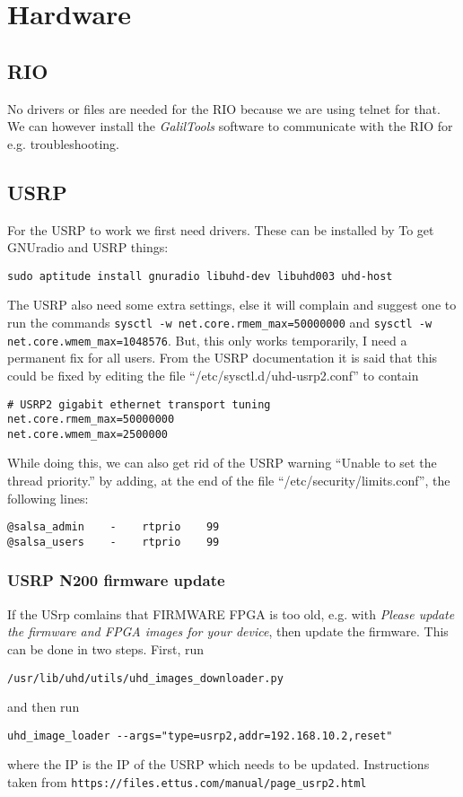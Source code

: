 \section{Hardware}
\subsection{RIO}
No drivers or files are needed for the RIO because we are using telnet for
that. We can however install the \emph{GalilTools} software to communicate
with the RIO for e.g. troubleshooting.

\subsection{USRP}
For the USRP to work we first need drivers. These can be installed by
To get GNUradio and USRP things: 
\begin{verbatim}
sudo aptitude install gnuradio libuhd-dev libuhd003 uhd-host
\end{verbatim}

The USRP also need some extra settings, else it will complain and suggest one
to run the commands 
\verb!sysctl -w net.core.rmem_max=50000000! and 
\verb!sysctl -w net.core.wmem_max=1048576!. But, this only works
temporarily, I need a permanent fix for all users. From the USRP documentation
it is said that this could be fixed by editing the file
“/etc/sysctl.d/uhd-usrp2.conf” to contain
\begin{verbatim}
# USRP2 gigabit ethernet transport tuning
net.core.rmem_max=50000000
net.core.wmem_max=2500000
\end{verbatim}
While doing this, we can also get rid of the USRP warning “Unable to set the
thread priority.” by adding, at the end of the file
“/etc/security/limits.conf”, the following lines: 
\begin{verbatim}
@salsa_admin    -    rtprio    99
@salsa_users    -    rtprio    99
\end{verbatim}

\subsubsection{USRP N200 firmware update}
If the USrp comlains that FIRMWARE FPGA is too old, e.g. with \emph{Please update the firmware and FPGA images for your device}, then update the firmware. This can be done in two steps. First, run
\begin{verbatim}
/usr/lib/uhd/utils/uhd_images_downloader.py
\end{verbatim}
and then run 
\begin{verbatim}
uhd_image_loader --args="type=usrp2,addr=192.168.10.2,reset"
\end{verbatim}
where the IP is the IP of the USRP which needs to be updated. Instructions
taken from \verb!https://files.ettus.com/manual/page_usrp2.html!

